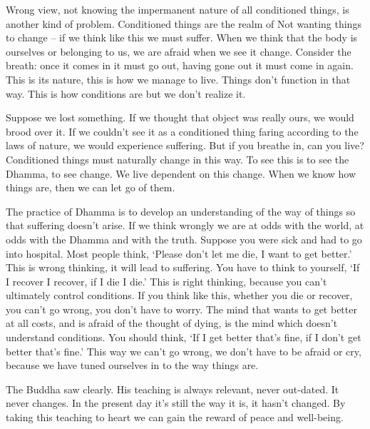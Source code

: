Wrong view, not knowing the impermanent nature of all conditioned things, is another kind of problem. Conditioned things are the realm of  Not wanting things to change -- if we think like this we must suffer. When we think that the body is ourselves or belonging to us, we are afraid when we see it change. Consider the breath: once it comes in it must go out, having gone out it must come in again. This is its nature, this is how we manage to live. Things don't function in that way. This is how conditions are but we don't realize it. 

Suppose we lost something. If we thought that object was really ours, we would brood over it. If we couldn't see it as a conditioned thing faring according to the laws of nature, we would experience suffering. But if you breathe in, can you live? Conditioned things must naturally change in this way. To see this is to see the Dhamma, to see  change. We live dependent on this change. When we know how things are, then we can let go of them. 

The practice of Dhamma is to develop an understanding of the way of things so that suffering doesn't arise. If we think wrongly we are at odds with the world, at odds with the Dhamma and with the truth. Suppose you were sick and had to go into hospital. Most people think, `Please don't let me die, I want to get better.' This is wrong thinking, it will lead to suffering. You have to think to yourself, `If I recover I recover, if I die I die.' This is right thinking, because you can't ultimately control conditions. If you think like this, whether you die or recover, you can't go wrong, you don't have to worry. The mind that wants to get better at all costs, and is afraid of the thought of dying, is the mind which doesn't understand conditions. You should think, `If I get better that's fine, if I don't get better that's fine.' This way we can't go wrong, we don't have to be afraid or cry, because we have tuned ourselves in to the way things are. 

The Buddha saw clearly. His teaching is always relevant, never out-dated. It never changes. In the present day it's still the way it is, it hasn't changed. By taking this teaching to heart we can gain the reward of peace and well-being. 

